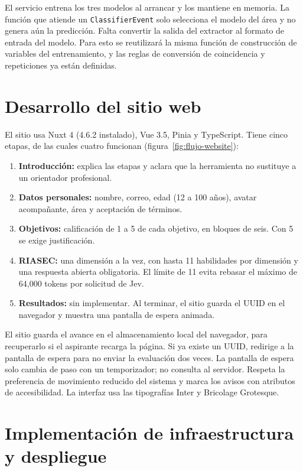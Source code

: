 El servicio entrena los tres modelos al arrancar y los mantiene en memoria. La función que atiende un \texttt{ClassifierEvent} solo selecciona el modelo del área y no genera aún la predicción. Falta convertir la salida del extractor al formato de entrada del modelo. Para esto se reutilizará la misma función de construcción de variables del entrenamiento, y las reglas de conversión de coincidencia y repeticiones ya están definidas.

\section{Desarrollo del sitio web}
El sitio usa Nuxt 4 (4.6.2 instalado), Vue 3.5, Pinia y TypeScript. Tiene cinco etapas, de las cuales cuatro funcionan (figura~\ref{fig:flujo-website}):
\begin{enumerate}
    \item \textbf{Introducción:} explica las etapas y aclara que la herramienta no sustituye a un orientador profesional.
    \item \textbf{Datos personales:} nombre, correo, edad (12 a 100 años), avatar acompañante, área y aceptación de términos.
    \item \textbf{Objetivos:} calificación de 1 a 5 de cada objetivo, en bloques de seis. Con 5 se exige justificación.
    \item \textbf{RIASEC:} una dimensión a la vez, con hasta 11 habilidades por dimensión y una respuesta abierta obligatoria. El límite de 11 evita rebasar el máximo de 64,000 tokens por solicitud de Jev.
    \item \textbf{Resultados:} sin implementar. Al terminar, el sitio guarda el UUID en el navegador y muestra una pantalla de espera animada.
\end{enumerate}
El sitio guarda el avance en el almacenamiento local del navegador, para recuperarlo si el aspirante recarga la página. Si ya existe un UUID, redirige a la pantalla de espera para no enviar la evaluación dos veces. La pantalla de espera solo cambia de paso con un temporizador; no consulta al servidor. Respeta la preferencia de movimiento reducido del sistema y marca los avisos con atributos de accesibilidad. La interfaz usa las tipografías Inter y Bricolage Grotesque.

\section{Implementación de infraestructura y despliegue}

